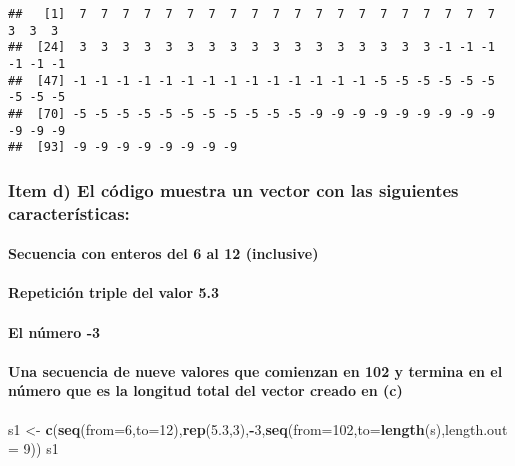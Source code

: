 \documentclass[]{article}
\newenvironment{Shaded}{\begin{snugshade}}{\end{snugshade}}
\newcommand{\KeywordTok}[1]{\textcolor[rgb]{0.13,0.29,0.53}{\textbf{#1}}}
\newcommand{\DataTypeTok}[1]{\textcolor[rgb]{0.13,0.29,0.53}{#1}}
\newcommand{\DecValTok}[1]{\textcolor[rgb]{0.00,0.00,0.81}{#1}}
\newcommand{\FloatTok}[1]{\textcolor[rgb]{0.00,0.00,0.81}{#1}}
\newcommand{\StringTok}[1]{\textcolor[rgb]{0.31,0.60,0.02}{#1}}
\newcommand{\OperatorTok}[1]{\textcolor[rgb]{0.81,0.36,0.00}{\textbf{#1}}}
\newcommand{\NormalTok}[1]{#1}
\let\oldparagraph\paragraph
\renewcommand{\paragraph}[1]{\oldparagraph{#1}\mbox{}}
\begin{document}
\begin{verbatim}
##   [1]  7  7  7  7  7  7  7  7  7  7  7  7  7  7  7  7  7  7  7  7  3  3  3
##  [24]  3  3  3  3  3  3  3  3  3  3  3  3  3  3  3  3  3 -1 -1 -1 -1 -1 -1
##  [47] -1 -1 -1 -1 -1 -1 -1 -1 -1 -1 -1 -1 -1 -1 -5 -5 -5 -5 -5 -5 -5 -5 -5
##  [70] -5 -5 -5 -5 -5 -5 -5 -5 -5 -5 -5 -9 -9 -9 -9 -9 -9 -9 -9 -9 -9 -9 -9
##  [93] -9 -9 -9 -9 -9 -9 -9 -9
\end{verbatim}

\subsubsection{Item d) El código muestra un vector con las siguientes
características:}\label{item-d-el-codigo-muestra-un-vector-con-las-siguientes-caracteristicas}

\paragraph{Secuencia con enteros del 6 al 12
(inclusive)}\label{secuencia-con-enteros-del-6-al-12-inclusive}

\paragraph{Repetición triple del valor
5.3}\label{repeticion-triple-del-valor-5.3}

\paragraph{El número -3}\label{el-numero--3}

\paragraph{Una secuencia de nueve valores que comienzan en 102 y termina
en el número que es la longitud total del vector creado en
(c)}\label{una-secuencia-de-nueve-valores-que-comienzan-en-102-y-termina-en-el-numero-que-es-la-longitud-total-del-vector-creado-en-c}

\begin{Shaded}
\begin{Highlighting}[]
\NormalTok{s1 <-}\StringTok{ }\KeywordTok{c}\NormalTok{(}\KeywordTok{seq}\NormalTok{(}\DataTypeTok{from=}\DecValTok{6}\NormalTok{,}\DataTypeTok{to=}\DecValTok{12}\NormalTok{),}\KeywordTok{rep}\NormalTok{(}\FloatTok{5.3}\NormalTok{,}\DecValTok{3}\NormalTok{),}\OperatorTok{-}\DecValTok{3}\NormalTok{,}\KeywordTok{seq}\NormalTok{(}\DataTypeTok{from=}\DecValTok{102}\NormalTok{,}\DataTypeTok{to=}\KeywordTok{length}\NormalTok{(s),}\DataTypeTok{length.out =} \DecValTok{9}\NormalTok{))}
\NormalTok{s1}
\end{Highlighting}
\end{Shaded}
\end{document}
